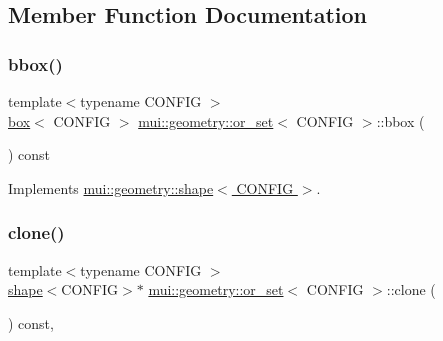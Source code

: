 \subsection{Member Function Documentation}
\mbox{\label{classmui_1_1geometry_1_1or__set_ac5789620d2af6810d8f7c02d5190429f}} 
\subsubsection{\texorpdfstring{bbox()}{bbox()}}
{\footnotesize\ttfamily template$<$typename C\+O\+N\+F\+IG $>$ \\
\hyperlink{classmui_1_1geometry_1_1box}{box}$<$ C\+O\+N\+F\+IG $>$ \hyperlink{classmui_1_1geometry_1_1or__set}{mui\+::geometry\+::or\+\_\+set}$<$ C\+O\+N\+F\+IG $>$\+::bbox (\begin{DoxyParamCaption}{ }\end{DoxyParamCaption}) const\hspace{0.3cm}{\ttfamily [virtual]}}



Implements \hyperlink{classmui_1_1geometry_1_1shape_adf598ec651ea425553bd8e617cac7430}{mui\+::geometry\+::shape$<$ C\+O\+N\+F\+I\+G $>$}.

\mbox{\label{classmui_1_1geometry_1_1or__set_a265ef0385d0822f3222e0ef669eb4fc5}} 
\subsubsection{\texorpdfstring{clone()}{clone()}}
{\footnotesize\ttfamily template$<$typename C\+O\+N\+F\+IG $>$ \\
\hyperlink{classmui_1_1geometry_1_1shape}{shape}$<$C\+O\+N\+F\+IG$>$$\ast$ \hyperlink{classmui_1_1geometry_1_1or__set}{mui\+::geometry\+::or\+\_\+set}$<$ C\+O\+N\+F\+IG $>$\+::clone (\begin{DoxyParamCaption}{ }\end{DoxyParamCaption}) const\hspace{0.3cm}{\ttfamily [inline]}, {\ttfamily [virtual]}}



